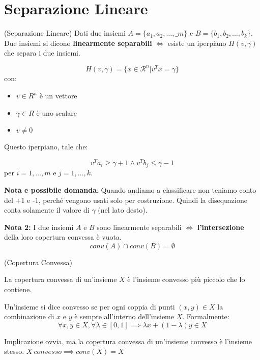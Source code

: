 \section{Separazione Lineare}
\begin{definition}
    (Separazione Lineare)
    Dati due insiemi $A = \{a_1, a_2, \dots, \_m\}$ e $B = \{b_1, b_2, \dots, b_k\}$. Due insiemi si dicono \textbf{linearmente separabili} $\iff$ esiste un iperpiano $H(v,\gamma)$ che separa i due insiemi.

    $$
        H(v,\gamma) = \{x \in \mathcal{R}^n | v^T x = \gamma\}
    $$
    con:
    \begin{itemize}
        \item $v \in R^n$ è un vettore
        \item $\gamma \in R$ è uno scalare
        \item $v \neq 0$
    \end{itemize}

    Questo iperpiano, tale che:

    $$
        v^T a_i \geq \gamma + 1 \land v^T b_j \leq \gamma - 1
    $$
    per $i = 1, \dots, m$ e $j = 1, \dots, k$.
\end{definition}

\textbf{Nota e possibile domanda}: Quando andiamo a classificare non teniamo conto del +1 e -1, perché vengono usati solo per costruzione.
Quindi la disequazione conta solamente il valore di $\gamma$ (nel lato desto).

\textbf{Nota 2:} I due insiemi $A$ e $B$ sono linearmente separabili $\iff$ \textbf{l'intersezione} della loro copertura convessa è vuota.
$$
    conv(A) \cap conv(B) = \emptyset
$$

\begin{definition}
    (Copertura Convessa)

    La copertura convessa di un'insieme $X$ è l'insieme convesso più piccolo che lo
    contiene.

    Un'insieme si dice convesso se per ogni coppia di punti $(x,y) \in X$ la
    combinazione di $x$ e $y$ è sempre all'interno dell'insieme $X$. Formalmente:
    $$ \forall x,y \in X, \forall \lambda \in [0,1] \implies \lambda x + (1 -
        \lambda) y \in X $$
\end{definition}

Implicazione ovvia, ma la copertura convessa di un'insieme convesso è l'insieme
stesso. $ X\ convesso \implies conv(X) = X $

